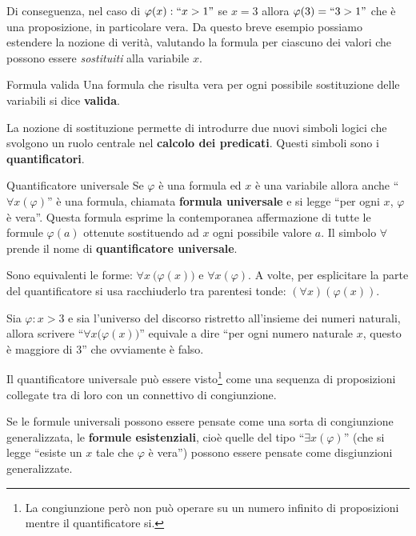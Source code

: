 Di conseguenza, nel caso di $\varphi(x):``x>1"$ se $x=3$ allora $\varphi(3)=``3>1"$ che è una proposizione, in particolare vera. Da questo breve esempio possiamo estendere la nozione di verità, valutando la formula per ciascuno dei valori che possono essere \emph{sostituiti} alla variabile $x$.

\begin{defbox}{Formula valida}
	Una formula che risulta vera per ogni possibile sostituzione delle variabili si dice \textbf{valida}.
\end{defbox}
La nozione di sostituzione permette di introdurre due nuovi simboli logici che svolgono un ruolo centrale nel \textbf{calcolo dei predicati}. Questi simboli sono i \textbf{quantificatori}.

\begin{defbox}{Quantificatore universale}
	Se $\varphi$ è una formula ed $x$ è una variabile allora anche ``$\forall x(\varphi)$'' è una formula, chiamata \textbf{formula universale} e si legge ``per ogni $x$, $\varphi$ è vera''. Questa formula esprime la contemporanea affermazione di tutte le formule $\varphi(a)$ ottenute sostituendo ad $x$ ogni possibile valore $a$.
	Il simbolo $\forall$ prende il nome di \textbf{quantificatore universale}.
\end{defbox}

\begin{osservation}
	Sono equivalenti le forme: $\forall x \ \bigl( \varphi(x) \bigr)$ e $\forall x(\varphi)$. A volte, per esplicitare la parte del quantificatore si usa racchiuderlo tra parentesi tonde: $(\forall x) (\varphi(x))$.
\end{osservation}

\begin{example}
	Sia $\varphi : x > 3$ e sia l'universo del discorso ristretto all'insieme dei numeri naturali, allora scrivere ``$\forall x \bigl(\varphi(x)\bigr)$'' equivale a dire ``per ogni numero naturale $x$, questo è maggiore di 3'' che ovviamente è falso.
\end{example}

\begin{osservation}
	Il quantificatore universale può essere visto\footnote{La congiunzione però non può operare su un numero infinito di proposizioni mentre il quantificatore si.} come una sequenza di proposizioni collegate tra di loro con un connettivo di congiunzione.
\end{osservation}

Se le formule universali possono essere pensate come una sorta di congiunzione generalizzata, le \textbf{formule esistenziali}, cioè quelle del tipo ``$\exists x(\varphi)$'' (che si legge ``esiste un $x$ tale che $\varphi$ è vera'') possono essere pensate come disgiunzioni generalizzate.

